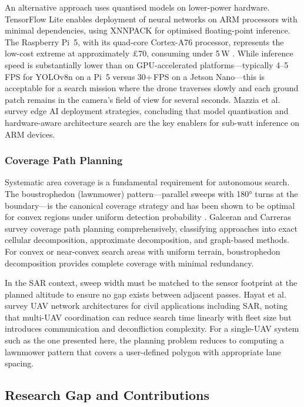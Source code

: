 An alternative approach uses quantised models on lower-power hardware. TensorFlow Lite \cite{tflite} enables deployment of neural networks on ARM processors with minimal dependencies, using XNNPACK \cite{xnnpack} for optimised floating-point inference. The Raspberry Pi~5, with its quad-core Cortex-A76 processor, represents the low-cost extreme at approximately \pounds{}70, consuming under 5\,W \cite{raspberrypi5}. While inference speed is substantially lower than on GPU-accelerated platforms---typically 4--5\,FPS for YOLOv8n on a Pi~5 versus 30+\,FPS on a Jetson Nano---this is acceptable for a search mission where the drone traverses slowly and each ground patch remains in the camera's field of view for several seconds. Mazzia et al.\ \cite{mazzia2022} survey edge AI deployment strategies, concluding that model quantisation and hardware-aware architecture search are the key enablers for sub-watt inference on ARM devices.

\subsubsection{Coverage Path Planning}

Systematic area coverage is a fundamental requirement for autonomous search. The boustrophedon (lawnmower) pattern---parallel sweeps with \ang{180} turns at the boundary---is the canonical coverage strategy and has been shown to be optimal for convex regions under uniform detection probability \cite{boustrophedon}. Galceran and Carreras \cite{covpath} survey coverage path planning comprehensively, classifying approaches into exact cellular decomposition, approximate decomposition, and graph-based methods. For convex or near-convex search areas with uniform terrain, boustrophedon decomposition provides complete coverage with minimal redundancy.

In the SAR context, sweep width must be matched to the sensor footprint at the planned altitude to ensure no gap exists between adjacent passes. Hayat et al.\ \cite{multiuav} survey UAV network architectures for civil applications including SAR, noting that multi-UAV coordination can reduce search time linearly with fleet size but introduces communication and deconfliction complexity. For a single-UAV system such as the one presented here, the planning problem reduces to computing a lawnmower pattern that covers a user-defined polygon with appropriate lane spacing.

\subsection{Research Gap and Contributions}\label{sec:contributions}

